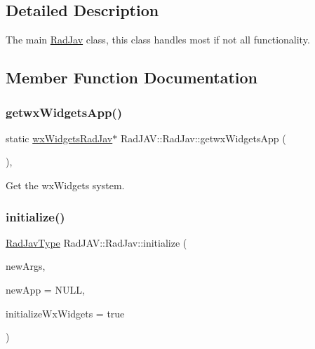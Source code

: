 \subsection{Detailed Description}
The main \mbox{\hyperlink{class_rad_j_a_v_1_1_rad_jav}{Rad\+Jav}} class, this class handles most if not all functionality. 

\subsection{Member Function Documentation}
\mbox{\label{class_rad_j_a_v_1_1_rad_jav_a524921ac787c2c33cd9d76e6f89bac67}} 
\subsubsection{\texorpdfstring{getwx\+Widgets\+App()}{getwxWidgetsApp()}}
{\footnotesize\ttfamily static \mbox{\hyperlink{class_rad_j_a_v_1_1wx_widgets_rad_jav}{wx\+Widgets\+Rad\+Jav}}$\ast$ Rad\+J\+A\+V\+::\+Rad\+Jav\+::getwx\+Widgets\+App (\begin{DoxyParamCaption}{ }\end{DoxyParamCaption})\hspace{0.3cm}{\ttfamily [inline]}, {\ttfamily [static]}}



Get the wx\+Widgets system. 

\mbox{\label{class_rad_j_a_v_1_1_rad_jav_a04f3d51b1f677d8a832696a7f5b4bc6e}} 
\subsubsection{\texorpdfstring{initialize()}{initialize()}\hspace{0.1cm}{\footnotesize\ttfamily [1/2]}}
{\footnotesize\ttfamily \mbox{\hyperlink{namespace_rad_j_a_v_a74e0b9a4c586a0346af4029e5a7e3d30}{Rad\+Jav\+Type}} Rad\+J\+A\+V\+::\+Rad\+Jav\+::initialize (\begin{DoxyParamCaption}\item[{\mbox{\hyperlink{class_rad_j_a_v_1_1_array}{Array}}$<$ \mbox{\hyperlink{class_rad_j_a_v_1_1_string}{String}} $>$}]{new\+Args,  }\item[{\mbox{\hyperlink{class_rad_j_a_v_1_1wx_widgets_rad_jav}{wx\+Widgets\+Rad\+Jav}} $\ast$}]{new\+App = {\ttfamily NULL},  }\item[{bool}]{initialize\+Wx\+Widgets = {\ttfamily true} }\end{DoxyParamCaption})\hspace{0.3cm}{\ttfamily [static]}}



